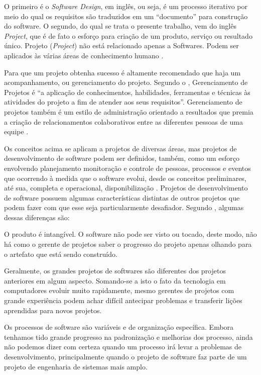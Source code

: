 \documentclass[
    12pt,               %
    openright,          %
    twoside,            %
    a4paper,            %
    chapter=TITLE,     %
    english,            %
    spanish,            %
    portuguese              %
    ]{abntex2}
\newcommand\dblquote[1]{\textquotedblleft #1\textquotedblright}
\begin{document}
O primeiro é o \textit{Software Design}, em inglês, ou seja, é um processo iterativo por meio do qual os requisitos são traduzidos em um \dblquote{documento} para construção do software. O segundo, do qual se trata o presente trabalho, vem do inglês \textit{Project}, que é de fato o esforço para criação de um produto, serviço ou resultado único. Projeto (\textit{Project}) não está relacionado apenas a Softwares. Podem ser aplicados às várias áreas de conhecimento humano \cite{pressman2006}.

Para que um projeto obtenha sucesso é altamente recomendado que haja um acompanhamento, ou gerenciamento do projeto. Segundo o , Gerenciamento de Projetos é \dblquote{a aplicação de conhecimentos, habilidades, ferramentas e técnicas às atividades do projeto a fim de atender aos seus requisitos}. Gerenciamento de projetos também é um estilo de administração orientado a resultados que premia a criação de relacionamentos colaborativos entre as diferentes pessoas de uma equipe \cite[p.~3]{grayLarson2009}.

Os conceitos acima se aplicam a projetos de diversas áreas, mas projetos de desenvolvimento de software podem ser definidos, também, como um esforço envolvendo planejamento monitoração e controle de pessoas, processos e eventos que ocorrendo à medida que o software evolui, desde os conceitos preliminares, até sua, completa e operacional, disponibilização \cite{pressman2011}. Projetos de desenvolvimento de software possuem algumas características distintas de outros projetos que podem fazer com que esse seja particularmente desafiador. Segundo , algumas dessas diferenças são:

\begin{alineas}
	\item O produto é intangível. O software não pode ser visto ou tocado, deste modo, não há como o gerente de projetos saber o progresso do projeto apenas olhando para o artefato que está sendo construído.
	\item Geralmente, os grandes projetos de softwares são diferentes dos projetos anteriores em algum aspecto. Somando-se a isto o fato da tecnologia em computadores evoluir muito rapidamente, mesmo gerentes de projetos com grande experiência podem achar difícil antecipar problemas e transferir lições aprendidas para novos projetos.
	\item Os processos de software são variáveis e de organização específica. Embora tenhamos tido grande progresso na padronização e melhorias dos processo, ainda não podemos dizer com certeza quando um processo irá levar a problemas de desenvolvimento, principalmente quando o projeto de software faz parte de um projeto de engenharia de sistemas mais amplo.
\end{alineas}
\end{document}
